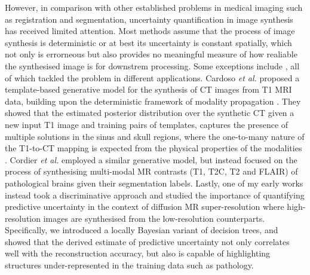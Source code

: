 However, in comparison with other established problems in medical imaging such as registration and segmentation, uncertainty quantification in image synthesis has received limited attention. Most methods assume that the process of image synthesis is deterministic or at best its uncertainty is constant spatially, which not only is errorneous but also provides no meaningful measure of how realiable the synthesised image is for downstrem processing. Some exceptions include \cite{cardoso2015template,cordier2016extended,tanno2016bayesian}, all of which tackled the problem in different applications. Cardoso \textit{et al.} \cite{cardoso2015template} proposed a template-based generative model for the synthesis of CT images from T1 MRI data, building upon the deterministic framework of modality propagation \cite{ye2013modality}. They showed that the estimated posterior distribution over the synthetic CT given a new input T1 image and training pairs of templates, captures the presence of multiple solutions in the sinus and skull regions, where the one-to-many nature of the T1-to-CT mapping is expected from the physical properties of the modalities \cite{burgos2014attenuation}. Cordier \textit{et al.} \cite{cordier2016extended} employed a similar generative model, but instead focused on the process of synthesising multi-modal MR contrasts (T1, T2C, T2 and FLAIR) of pathological brains given their segmentation labels. Lastly, one of my early works \cite{tanno2016bayesian} instead took a discriminative approach and studied the importance of quantifying predictive uncertainty in the context of diffusion MR super-resolution where high-resolution images are synthesised from the low-resolution counterparts. Specifically, we introduced a locally Bayesian variant of decision trees, and showed that the derived estimate of predictive uncertainty not only correlates well with the reconstruction accuracy, but also is capable of highlighting structures under-represented in the training data such as pathology. 



